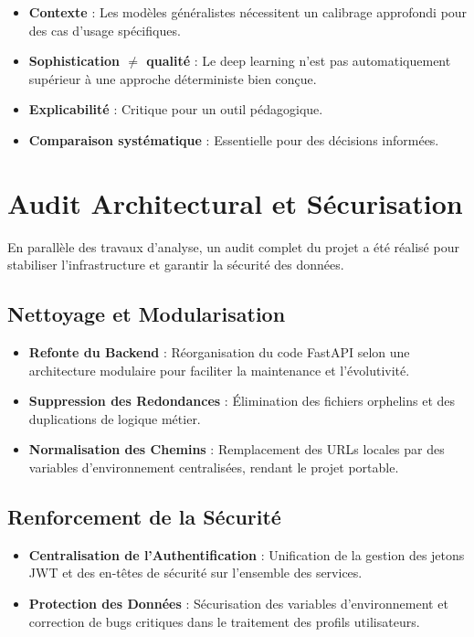 \documentclass[12pt,a4paper]{article}
\begin{document}
\begin{itemize}
    \item \textbf{Contexte} : Les modèles généralistes nécessitent un calibrage approfondi pour des cas d'usage spécifiques.
    \item \textbf{Sophistication $\neq$ qualité} : Le deep learning n'est pas automatiquement supérieur à une approche déterministe bien conçue.
    \item \textbf{Explicabilité} : Critique pour un outil pédagogique.
    \item \textbf{Comparaison systématique} : Essentielle pour des décisions informées.
\end{itemize}

\section{Audit Architectural et Sécurisation}

En parallèle des travaux d'analyse, un audit complet du projet a été réalisé pour stabiliser l'infrastructure et garantir la sécurité des données.

\subsection{Nettoyage et Modularisation}
\begin{itemize}
    \item \textbf{Refonte du Backend} : Réorganisation du code FastAPI selon une architecture modulaire pour faciliter la maintenance et l'évolutivité.
    \item \textbf{Suppression des Redondances} : Élimination des fichiers orphelins et des duplications de logique métier.
    \item \textbf{Normalisation des Chemins} : Remplacement des URLs locales par des variables d'environnement centralisées, rendant le projet portable.
\end{itemize}

\subsection{Renforcement de la Sécurité}
\begin{itemize}
    \item \textbf{Centralisation de l'Authentification} : Unification de la gestion des jetons JWT et des en-têtes de sécurité sur l'ensemble des services.
    \item \textbf{Protection des Données} : Sécurisation des variables d'environnement et correction de bugs critiques dans le traitement des profils utilisateurs.
\end{itemize}
\end{document}

